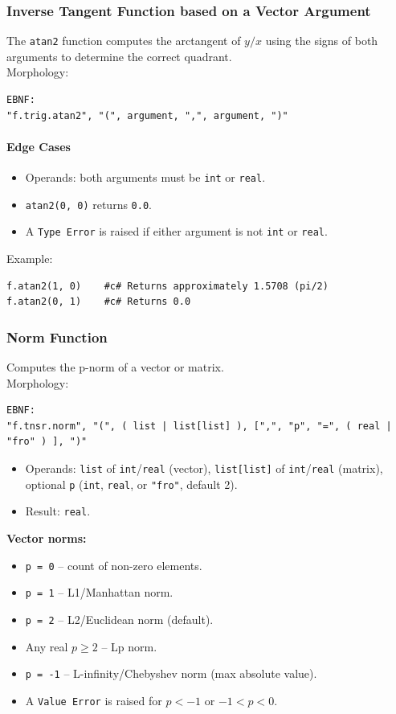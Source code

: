 \subsubsection{Inverse Tangent Function based on a Vector Argument}
The \texttt{atan2} function computes the arctangent of $y/x$ using the signs of both arguments to determine the correct quadrant. \\
Morphology:
\begin{verbatim}
EBNF:
"f.trig.atan2", "(", argument, ",", argument, ")"
\end{verbatim}
\paragraph{Edge Cases}
\begin{itemize}
\item Operands: both arguments must be \texttt{int} or \texttt{real}.
\item \texttt{atan2(0, 0)} returns \texttt{0.0}.
\item A \texttt{Type Error} is raised if either argument is not \texttt{int} or \texttt{real}.
\end{itemize}
Example:
\begin{verbatim}
f.atan2(1, 0)    #c# Returns approximately 1.5708 (pi/2)
f.atan2(0, 1)    #c# Returns 0.0
\end{verbatim}

\subsubsection{Norm Function}
Computes the p-norm of a vector or matrix. \\
Morphology:
\begin{verbatim}
EBNF:
"f.tnsr.norm", "(", ( list | list[list] ), [",", "p", "=", ( real | "fro" ) ], ")"
\end{verbatim}
\begin{itemize}
\item Operands: \texttt{list} of \texttt{int}/\texttt{real} (vector), \texttt{list[list]} of \texttt{int}/\texttt{real} (matrix), optional \texttt{p} (\texttt{int}, \texttt{real}, or \texttt{"fro"}, default 2).
\item Result: \texttt{real}.
\end{itemize}

\textbf{Vector norms:}
\begin{itemize}
\item \texttt{p = 0} -- count of non-zero elements.
\item \texttt{p = 1} -- L1/Manhattan norm.
\item \texttt{p = 2} -- L2/Euclidean norm (default).
\item Any real $p \geq 2$ -- Lp norm.
\item \texttt{p = -1} -- L-infinity/Chebyshev norm (max absolute value).
\item A \texttt{Value Error} is raised for $p < -1$ or $-1 < p < 0$.
\end{itemize}

